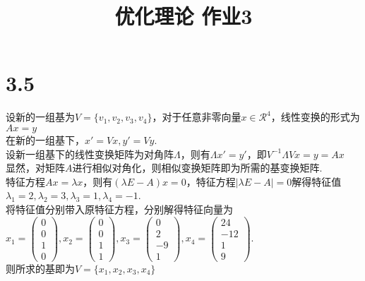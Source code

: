\documentclass{article}
\title{优化理论 作业3}
\author{}
\date{}
\begin{document}
\section*{3.5}
\noindent
设新的一组基为$V=\{v_1,v_2,v_3,v_4\}$，对于任意非零向量$x\in\mathcal{R}^4$，线性变换的形式为$Ax=y$\\
在新的一组基下，$x'=Vx,y'=Vy$.\\
设新一组基下的线性变换矩阵为对角阵$\Lambda$，则有$\Lambda x'=y'$，即$V^{-1}\Lambda Vx=y=Ax$\\
显然，对矩阵$A$进行相似对角化，则相似变换矩阵即为所需的基变换矩阵.\\
特征方程$Ax=\lambda x$，则有$(\lambda E-A)x=0$，特征方程$|\lambda E-A|=0$解得特征值$\lambda_1=2,\lambda_2=3,\lambda_3=1,\lambda_4=-1$.\\
将特征值分别带入原特征方程，分别解得特征向量为$x_1 = \left(
    \begin{array}{c}
        0 \\
        0 \\
        1 \\
        0
    \end{array}
\right),x_2 = \left(
    \begin{array}{c}
        0 \\
        0 \\
        1 \\
        1
    \end{array}
\right),x_3=\left(
    \begin{array}{c}
        0 \\
        2 \\
        -9 \\
        1
    \end{array}
\right),x_4=\left(
    \begin{array}{c}
        24 \\
        -12 \\
        1 \\
        9
    \end{array}
\right)$.\\则所求的基即为$V=\{x_1,x_2,x_3,x_4\}$
\end{document}

